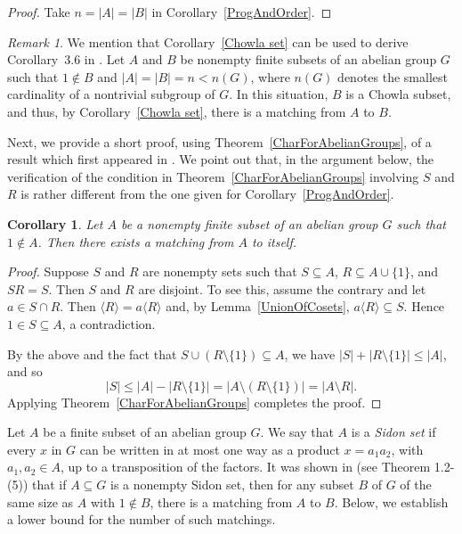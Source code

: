 \documentclass[11pt]{amsart}
\newtheorem{corollary}[theorem]{Corollary}
\theoremstyle{definition}
\theoremstyle{remark}
\newtheorem{remark}[theorem]{Remark}
\begin{document}
\begin{proof}
Take \( n = |A| = |B| \) in Corollary~\ref{ProgAndOrder}.
\end{proof}

\begin{remark}
    We mention that Corollary~\ref{Chowla set} can be used to derive Corollary~3.6 in \cite{Aliabadi 1}. Let \( A \) and \( B \) be nonempty finite subsets of an abelian group \( G \) such that \( 1 \notin B \) and \( |A| = |B| = n < n(G) \), where \( n(G) \) denotes the smallest cardinality of a nontrivial subgroup of \( G \). In this situation, \( B \) is a Chowla subset, and thus, by Corollary~\ref{Chowla set}, there is a matching from \( A \) to \( B \).
\end{remark}

Next, we provide a short proof, using Theorem~\ref{CharForAbelianGroups}, of a result which first appeared in \cite{Losonczy 2}. We point out that, in the argument below, the verification of the condition in Theorem~\ref{CharForAbelianGroups} involving \( S \) and \( R \) is rather different from the one given for Corollary~\ref{ProgAndOrder}.


\begin{corollary}\label{sym abelian}
Let \( A \) be a nonempty finite subset of an abelian group \( G \) such that \( 1 \notin A \). Then there exists a matching from \( A \) to itself.
\end{corollary}

\begin{proof}
Suppose \( S \) and \( R \) are nonempty sets such that \( S \subseteq A \), \( R \subseteq A \cup \{ 1 \} \), and \( SR = S \).  Then \( S \) and \( R \) are disjoint.  To see this, assume the contrary and let \( a \in S \cap R \). Then \( \langle R \rangle = a \langle R \rangle \) and, by Lemma~\ref{UnionOfCosets}, \( a \langle R \rangle \subseteq S \).  Hence \( 1 \in S \subseteq A \), a contradiction.

By the above and the fact that \( S \cup (R \setminus \{ 1 \} ) \subseteq A \), we have \( |S| + |R \setminus \{ 1 \} | \leq |A| \), and so 
\[ |S| \leq |A| - |R \setminus \{ 1 \} | = |A \setminus (R \setminus \{ 1 \} )| = |A \setminus R|. \]  
Applying Theorem~\ref{CharForAbelianGroups} completes the proof.
\end{proof}

Let \( A \) be a finite subset of an abelian group \( G \).  We say that \( A \) is a {\em Sidon set} if every \( x \) in \( G \) can be written in at most one way as a product \( x = a_1a_2 \), with \( a_1, a_2 \in A \), up to a transposition of the factors.  It was shown in \cite{Aliabadi 2} (see Theorem 1.2-(5)) that if \( A \subseteq G \) is a nonempty Sidon set, then for any subset \( B \) of \( G \) of the same size as \( A \) with \( 1 \notin B \), there is a matching from \( A \) to \( B \).  Below, we establish a lower bound for the number of such matchings.   
 
\end{document}
